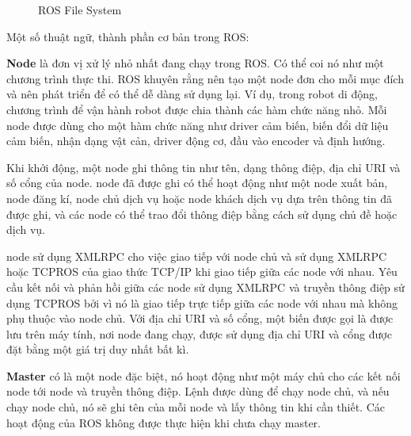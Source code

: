 {\begin{figure}[htbp]
  \caption{ROS File System}
  \label{fig:ros-filesystem}
\end{figure}

Một số thuật ngữ, thành phần cơ bản trong ROS:

\textbf{Node} là đơn vị xử lý nhỏ nhất đang chạy trong ROS. Có thể coi nó như một chương trình thực thi. ROS khuyên rằng nên tạo một node đơn cho mỗi mục đích và nên phát triển để có thể dễ dàng sử dụng lại. Ví dụ, trong robot di động, chương trình để vận hành robot được chia thành các hàm chức năng nhỏ. Mỗi node được dùng cho một hàm chức năng như driver cảm biến, biến đổi dữ liệu cảm biến, nhận dạng vật cản, driver động cơ, đầu vào encoder và định hướng.

Khi khởi động, một node ghi thông tin như tên, dạng thông điệp, địa chỉ URI và số cổng của node. node đã được ghi có thể hoạt động như một node xuất bản, node đăng kí, node chủ dịch vụ hoặc node khách dịch vụ dựa trên thông tin đã được ghi, và các node có thể trao đổi thông điệp bằng cách sử dụng chủ đề hoặc dịch vụ.

node sử dụng XMLRPC cho việc giao tiếp với node chủ và sử dụng XMLRPC hoặc TCPROS của giao thức TCP/IP khi giao tiếp giữa các node với nhau. Yêu cầu kết nối và phản hồi giữa các node sử dụng XMLRPC và truyền thông điệp sử dụng TCPROS bởi vì nó là giao tiếp trực tiếp giữa các node với nhau mà không phụ thuộc vào node chủ. Với địa chỉ URI và số cổng, một biến được gọi là  được lưu trên máy tính, nơi node đang chạy, được sử dụng địa chỉ URI và cổng được đặt bằng một giá trị duy nhất bất kì.

\textbf{Master} có là một node đặc biệt, nó hoạt động như một máy chủ cho các kết nối node tới node và truyền thông điệp. Lệnh  được dùng để chạy node chủ, và nếu chạy node chủ, nó sẽ ghi tên của mỗi node và lấy thông tin khi cần thiết. Các hoạt động của ROS không được thực hiện khi chưa chạy master.

}
